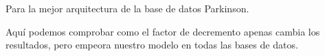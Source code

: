 Para la mejor arquitectura de la base de datos Parkinson.
\begin{table}[H]
\centering
\vspace{1ex}
\small
{}
\caption{Variaciones Factor decremento para base datos Parkinsons }
\label{VariacionesDivorce}
\end{table} 

Aquí podemos comprobar como el factor de decremento apenas cambia los resultados, pero empeora nuestro modelo en todas las bases de datos.

